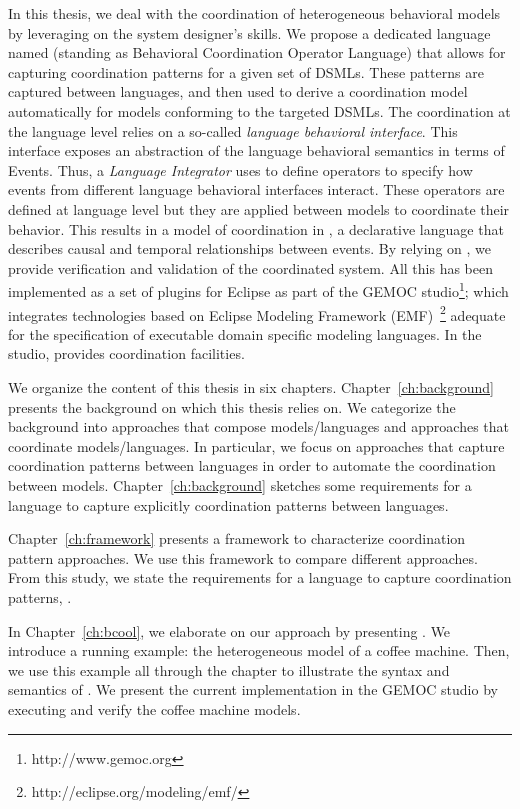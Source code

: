 In this thesis, we deal with the coordination of heterogeneous behavioral models by leveraging on the system designer's skills. We propose a dedicated language named \bcool (standing as Behavioral Coordination Operator Language) that allows for capturing coordination patterns for a given set of DSMLs. These patterns are captured between languages, and then used to derive a coordination model automatically for models conforming to the targeted DSMLs. The coordination at the language level relies on a so-called \emph{language behavioral interface}. This interface exposes an abstraction of the language behavioral semantics in terms of Events. Thus, a \emph{Language Integrator} uses \bcool to define operators to specify how events from different language behavioral interfaces interact. These operators are defined at language level but they are applied between models to coordinate their behavior. This results in a model of coordination in \ccsl, a declarative language that describes causal and temporal relationships between events. By relying on \ccsl, we provide verification and validation of the coordinated system. All this has been implemented as a set of plugins for Eclipse as part of the GEMOC studio\footnote{http://www.gemoc.org}; which integrates technologies based on Eclipse Modeling Framework (EMF)~\footnote{http://eclipse.org/modeling/emf/} adequate for the specification of executable domain specific modeling languages. In the studio, \bcool provides coordination facilities.   

We organize the content of this thesis in six chapters. Chapter~\ref{ch:background} presents the background on which this thesis relies on. We categorize the background into approaches that compose models/languages and approaches that coordinate models/languages. In particular, we focus on approaches that capture coordination patterns between languages in order to automate the coordination between models. Chapter~\ref{ch:background} sketches some requirements for a language to capture explicitly coordination patterns between languages.    

Chapter~\ref{ch:framework} presents a framework to characterize coordination pattern approaches. We use this framework to compare different approaches. From this study, we state the requirements for a language to capture coordination patterns, \ie \bcool.  

In Chapter~\ref{ch:bcool}, we elaborate on our approach by presenting \bcool. We introduce a running example: the heterogeneous model of a coffee machine. Then, we use this example all through the chapter to illustrate the syntax and semantics of \bcool. We present the current implementation in the GEMOC studio by executing and verify the coffee machine models. 

